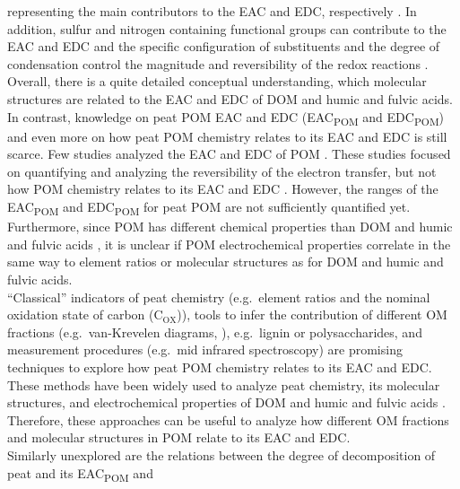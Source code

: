 \documentclass[draft,linenumbers]{agujournal2018}
\begin{document}
representing the main contributors to the EAC and EDC, respectively
\citep{Aeschbacher.2010, Tan.2017}. In addition, sulfur and nitrogen
containing functional groups can contribute to the EAC and EDC
\citep{Fimmen.2007, Ratasuk.2007, HernandezMontoya.2012} and the
specific configuration of substituents and the degree of condensation
control the magnitude and reversibility of the redox reactions
\citep{Ratasuk.2007, Uchimiya.2009}. Overall, there is a quite detailed
conceptual understanding, which molecular structures are related to the
EAC and EDC of DOM and humic and fulvic acids.\\
In contrast, knowledge on peat POM EAC and EDC (EAC\textsubscript{POM}
and EDC\textsubscript{POM}) and even more on how peat POM chemistry
relates to its EAC and EDC is still scarce. Few studies analyzed the EAC
and EDC of POM \citep{Keller.2013, Lau.2015, Lau.2016, Gao.2019}. These
studies focused on quantifying and analyzing the reversibility of the
electron transfer, but not how POM chemistry relates to its EAC and EDC
\citep{Keller.2013, Lau.2015, Lau.2016, Gao.2019}. However, the ranges
of the EAC\textsubscript{POM} and EDC\textsubscript{POM} for peat POM
are not sufficiently quantified yet. Furthermore, since POM has
different chemical properties than DOM and humic and fulvic acids
\citep{Worrall.2017, Lipczynska-Kochany.2018}, it is unclear if POM
electrochemical properties correlate in the same way to element ratios
or molecular structures as for DOM and humic and fulvic acids.\\
``Classical'' indicators of peat chemistry (e.g.~element ratios and the
nominal oxidation state of carbon (C\(_\text{OX}\))), tools to infer the
contribution of different OM fractions (e.g.~van-Krevelen diagrams,
\citet{Kim.2003}), e.g.~lignin or polysaccharides, and measurement
procedures (e.g.~mid infrared spectroscopy) are promising techniques to
explore how peat POM chemistry relates to its EAC and EDC. These methods
have been widely used to analyze peat chemistry, its molecular
structures, and electrochemical properties of DOM and humic and fulvic
acids
\citep{Worrall.2017, Leifeld.2012, Bader.2018, Moore.2018, Leifeld.2020, Cocozza.2003, Artz.2008, Hodgkins.2018, Tfaily.2014, Aeschbacher.2010, Aeschbacher.2012, Tan.2017, Lv.2018, LaCroix.2020}.
Therefore, these approaches can be useful to analyze how different OM
fractions and molecular structures in POM relate to its EAC and EDC.\\
Similarly unexplored are the relations between the degree of
decomposition of peat and its EAC\textsubscript{POM} and
\end{document}
